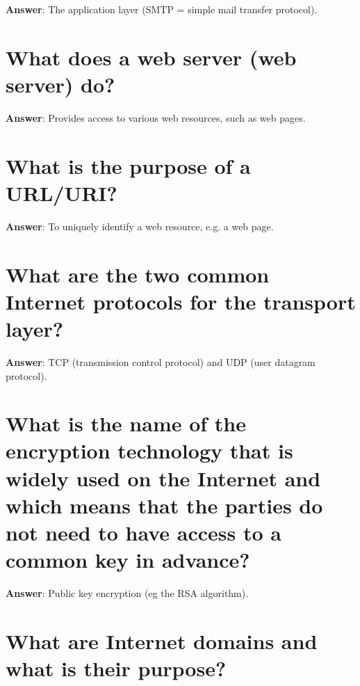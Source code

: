 \documentclass[a4paper,11pt,oneside]{book}
\begin{document}
\begin{sloppypar}
\label{q:145:sa:en:True}

\textbf{Answer}: The application layer (SMTP = simple mail transfer protocol).



\section{What does a web server (web server) do?}

\label{q:146:sa:en:True}

\textbf{Answer}: Provides access to various web resources, such as web pages.



\section{What is the purpose of a URL/URI?}

\label{q:147:sa:en:True}

\textbf{Answer}: To uniquely identify a web resource, e.g. a web page.



\section{What are the two common Internet protocols for the transport layer?}

\label{q:148:sa:en:True}

\textbf{Answer}: TCP (transmission control protocol) and UDP (user datagram protocol).



\section{What is the name of the encryption technology that is widely used on the Internet and which means that the parties do not need to have access to a common key in advance?}

\label{q:149:sa:en:True}

\textbf{Answer}: Public key encryption (eg the RSA algorithm).



\section{What are Internet domains and what is their purpose?}

\label{q:150:sa:en:True}


\end{sloppypar}
\end{document}
